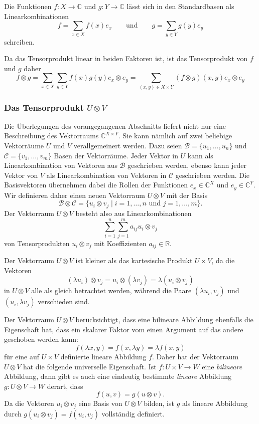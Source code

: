 Die Funktionen $f\colon X\to \mathbb{C}$ und $g\colon Y\to\mathbb{C}$
lässt sich in den Standardbasen als Linearkombinationen
\[
f = \sum_{x\in X} f(x)e_x
\qquad\text{und}\qquad
g = \sum_{y\in Y} g(y)e_y
\]
schreiben.

Da das Tensorprodukt linear in beiden Faktoren ist, ist das Tensorprodukt
von $f$ und $g$ daher
\[
f\otimes g
=
\sum_{x\in X}\sum_{y\in Y}
f(x)g(y) e_x\otimes e_y
=
\sum_{(x,y)\in X\times Y}
(f\otimes g)(x,y) e_x\otimes e_y
\]

%
%
\subsubsection{Das Tensorprodukt $U\otimes V$}
Die Überlegungen des vorangegangenen Abschnitts liefert nicht nur
eine Beschreibung des Vektorraums $\mathbb{C}^{X\times Y}$.
Sie kann nämlich auf zwei beliebige Vektorräume
$U$ und $V$ verallgemeinert werden.
Dazu seien $\mathcal{B}=\{u_1,\dots,u_n\}$ und $\mathcal{C}=\{v_1,\dots,v_m\}$
Basen der Vektorräume.
Jeder Vektor in $U$ kann als Linearkombination von Vektoren aus
$\mathcal{B}$ geschrieben werden, ebenso kann jeder Vektor von $V$
als Linearkombination von Vektoren in $\mathcal{C}$ geschrieben werden.
Die Basisvektoren übernehmen dabei die Rollen der Funktionen
$e_x\in \mathbb{C}^X$ und $e_y\in\mathbb{C}^Y$.
Wir definieren daher einen neuen Vektorraum $U\otimes V$ mit
der Basis
\[
\mathcal{B}\otimes\mathcal{C}
=
\{
u_i\otimes v_j
\mid
i=1,\dots,n\text{ und }j=1,\dots,m
\}.
\]
Der Vektorraum $U\otimes V$ besteht also aus Linearkombinationen
\[
\sum_{i=1}^n \sum_{j=1}^m
a_{i\!j} u_i\otimes v_j
\]
von Tensorprodukten $u_i\otimes v_j$ mit Koeffizienten
$a_{i\!j}\in \mathbb{R}$.

Der Vektorraum $U\otimes V$ ist kleiner als das kartesische Produkt
$U\times V$, da die Vektoren
\[
(\lambda u_i)\otimes v_j
=
u_i\otimes (\lambda v_j)
=
\lambda (u_i\otimes v_j)
\]
in $U\otimes V$ alle als gleich betrachtet werden, während die
Paare $(\lambda u_i,v_j)$ und $(u_i,\lambda v_j)$ verschieden sind.

Der Vektorraum $U\otimes V$ berücksichtigt, dass eine bilineare Abbildung
ebenfalls die Eigenschaft hat, dass ein skalarer Faktor vom einen
Argument auf das andere geschoben werden kann:
\[
f(\lambda x,y) = f(x,\lambda y) = \lambda f(x,y)
\]
für eine auf $U\times V$ definierte lineare Abbildung $f$.
Daher hat der Vektorraum $U\otimes V$ hat die folgende universelle
Eigenschaft.
Ist $f\colon U\times V\to W$ eine {\em bilineare} Abbildung, dann
gibt es auch eine eindeutig bestimmte {\em lineare} Abbildung
$g\colon U\otimes V\to W$ derart, dass
\[
f(u,v)
=
g(u\otimes v).
\]
Da die Vektoren $u_i\otimes v_j$ eine Basis von $U\otimes V$ bilden,
ist $g$ als lineare Abbildung durch $g(u_i\otimes v_j) = f(u_i,v_j)$
vollständig definiert.

